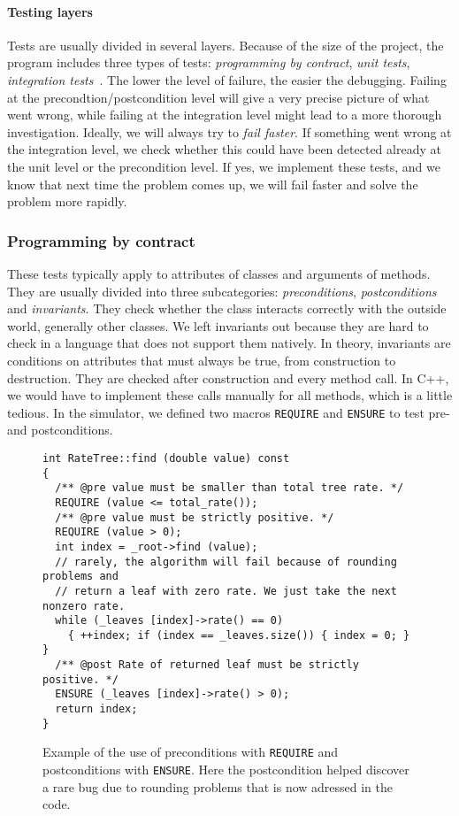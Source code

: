\paragraph{Testing layers} Tests are usually divided in several layers. Because of the size of the project, the program includes three types of tests: \emph{programming by contract}, \emph{unit tests}, \emph{integration tests}~. The lower the level of failure, the easier the debugging. Failing at the precondtion/postcondition level will give a very precise picture of what went wrong, while failing at the integration level might lead to a more thorough investigation. Ideally, we will always try to \emph{fail faster}. If something went wrong at the integration level, we check whether this could have been detected already at the unit level or the precondition level. If yes, we implement these tests, and we know that next time the problem comes up, we will fail faster and solve the problem more rapidly.


\subsubsection{Programming by contract} 

These tests typically apply to attributes of classes and arguments of methods. They are usually divided into three subcategories: \emph{preconditions}, \emph{postconditions} and \emph{invariants}. They check whether the class interacts correctly with the outside world, generally other classes. We left invariants out because they are hard to check in a language that does not support them natively. In theory, invariants are conditions on attributes that must always be true, from construction to destruction. They are checked after construction and every method call. In C++, we would have to implement these calls manually for all methods, which is a little tedious. In the simulator, we defined two macros \texttt{REQUIRE} and \texttt{ENSURE} to test pre- and postconditions.

\begin{figure}[!h]
  \centering
\begin{verbatim}
int RateTree::find (double value) const
{
  /** @pre value must be smaller than total tree rate. */
  REQUIRE (value <= total_rate());
  /** @pre value must be strictly positive. */
  REQUIRE (value > 0);
  int index = _root->find (value);
  // rarely, the algorithm will fail because of rounding problems and 
  // return a leaf with zero rate. We just take the next nonzero rate.
  while (_leaves [index]->rate() == 0) 
    { ++index; if (index == _leaves.size()) { index = 0; } }
  /** @post Rate of returned leaf must be strictly positive. */
  ENSURE (_leaves [index]->rate() > 0);
  return index;
}
\end{verbatim}
\caption{Example of the use of preconditions with \texttt{REQUIRE} and postconditions with \texttt{ENSURE}. Here the postcondition helped discover a rare bug due to rounding problems that is now adressed in the code.}
\label{fig:prepostconditions}
\end{figure}


